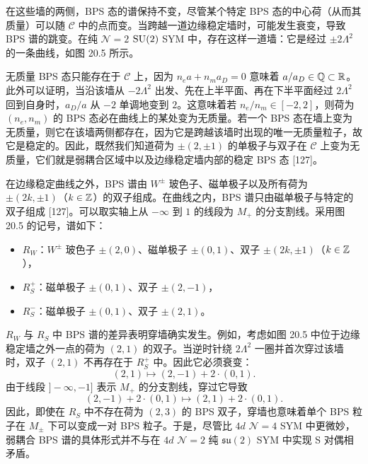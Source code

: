 在这些墙的两侧，BPS 态的谱保持不变，尽管某个特定 BPS 态的中心荷（从而其质量）可以随 $\mathcal{C}$ 中的点而变。当跨越一道边缘稳定墙时，可能发生衰变，导致 BPS 谱的跳变。在纯 $\mathcal{N}=2$ $\operatorname{SU}(2)$ SYM 中，存在这样一道墙：它是经过 $\pm2\Lambda^2$ 的一条曲线，如图 20.5 所示。


无质量 BPS 态只能存在于 $\mathcal{C}$ 上，因为 $n_ea+n_ma_D=0$ 意味着 $a/a_D\in\mathbb{Q}\subset\mathbb{R}$。此外可以证明，当沿该墙从 $-2\Lambda^2$ 出发、先在上半平面、再在下半平面经过 $2\Lambda^2$ 回到自身时，$a_D/a$ 从 $-2$ 单调地变到 $2$。这意味着若 $n_e/n_m\in[-2,2]$，则荷为 $(n_e,n_m)$ 的 BPS 态必在曲线上的某处变为无质量。若一个 BPS 态在墙上变为无质量，则它在该墙两侧都存在，因为它是跨越该墙时出现的唯一无质量粒子，故它是稳定的。因此，既然我们知道荷为 $\pm(2,\pm1)$ 的单极子与双子在 $\mathcal{C}$ 上变为无质量，它们就是弱耦合区域中以及边缘稳定墙内部的稳定 BPS 态 [127]。

\begin{proposition}[20.17]
在边缘稳定曲线之外，BPS 谱由 $W^\pm$ 玻色子、磁单极子以及所有荷为 $\pm(2k,\pm1)$（$k\in\mathbb{Z}$）的双子组成。在曲线之内，BPS 谱只由磁单极子与特定的双子组成 [127]。可以取实轴上从 $-\infty$ 到 $1$ 的线段为 $M_+$ 的分支割线。采用图 20.5 的记号，谱如下：
\begin{itemize}
\item $R_W$：$W^\pm$ 玻色子 $\pm(2,0)$、磁单极子 $\pm(0,1)$、双子 $\pm(2k,\pm1)$（$k\in\mathbb{Z}$），
\item $R^+_S$：磁单极子 $\pm(0,1)$、双子 $\pm(2,-1)$，
\item $R^-_S$：磁单极子 $\pm(0,1)$、双子 $\pm(2,1)$。
\end{itemize}
\end{proposition}

$R_W$ 与 $R_S$ 中 BPS 谱的差异表明穿墙确实发生。例如，考虑如图 20.5 中位于边缘稳定墙之外一点的荷为 $(2,1)$ 的双子。当逆时针绕 $2\Lambda^2$ 一圈并首次穿过该墙时，双子 $(2,1)$ 不再存在于 $R^+_S$ 中。因此它必须衰变：
\[
(2,1)\longmapsto(2,-1)+2\cdot(0,1).
\]
由于线段 $]-\infty,-1]$ 表示 $M_+$ 的分支割线，穿过它导致
\[
(2,-1)+2\cdot(0,1)\longmapsto(2,1)+2\cdot(0,1).
\]
因此，即使在 $R_S$ 中不存在荷为 $(2,3)$ 的 BPS 双子，穿墙也意味着单个 BPS 粒子在 $M_\pm$ 下可以变成一对 BPS 粒子。于是，尽管比 $4d$ $\mathcal{N}=4$ SYM 中更微妙，弱耦合 BPS 谱的具体形式并不与在 $4d$ $\mathcal{N}=2$ 纯 $\mathfrak{su}(2)$ SYM 中实现 S 对偶相矛盾。

